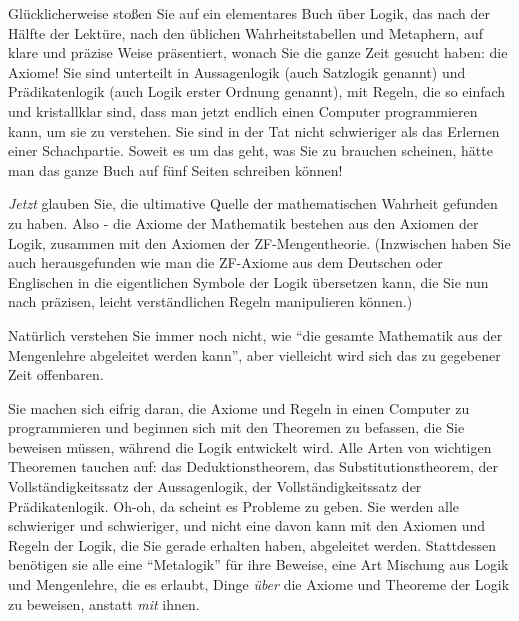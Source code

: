 Glücklicherweise stoßen Sie auf ein elementares Buch über Logik, das nach der Hälfte der Lektüre, nach den üblichen Wahrheitstabellen und Metaphern, auf klare und präzise Weise präsentiert, wonach Sie die ganze Zeit gesucht haben: die Axiome!  Sie sind unterteilt in Aussagenlogik (auch Satzlogik genannt) und Prädikatenlogik (auch Logik erster Ordnung genannt), mit Regeln, die so einfach und kristallklar sind, dass man jetzt endlich einen Computer programmieren kann, um sie zu verstehen.  Sie sind in der Tat nicht schwieriger als das Erlernen einer Schachpartie.
Soweit es um das geht, was Sie zu brauchen scheinen, hätte man das ganze Buch auf fünf Seiten schreiben können!

{\em Jetzt} glauben Sie, die ultimative Quelle der mathematischen Wahrheit gefunden zu haben.  Also - die Axiome der Mathematik bestehen aus den Axiomen der Logik, zusammen mit den Axiomen der ZF-Mengentheorie. (Inzwischen haben Sie auch herausgefunden wie man die ZF-Axiome aus dem Deutschen oder Englischen in die eigentlichen Symbole der Logik übersetzen kann, die Sie nun nach präzisen, leicht verständlichen Regeln manipulieren können.)

Natürlich verstehen Sie immer noch nicht, wie "`die gesamte Mathematik aus der Mengenlehre abgeleitet werden kann"', aber vielleicht wird sich das zu gegebener Zeit offenbaren.

Sie machen sich eifrig daran, die Axiome und Regeln in einen Computer zu programmieren und beginnen sich mit den Theoremen zu befassen, die Sie beweisen müssen, während die Logik entwickelt wird.  Alle Arten von wichtigen Theoremen tauchen auf: das Deduktionstheorem, das Substitutionstheorem, der Vollständigkeitssatz der Aussagenlogik, der Vollständigkeitssatz der Prädikatenlogik.
Oh-oh, da scheint es Probleme zu geben.  Sie werden alle schwieriger und schwieriger, und nicht eine davon kann mit den Axiomen und Regeln der Logik, die Sie gerade erhalten haben, abgeleitet werden.  Stattdessen benötigen sie alle eine "`Metalogik"' für ihre Beweise, eine Art Mischung aus Logik und Mengenlehre, die es erlaubt, Dinge {\em über} die Axiome und Theoreme der Logik zu beweisen, anstatt {\em mit} ihnen.


